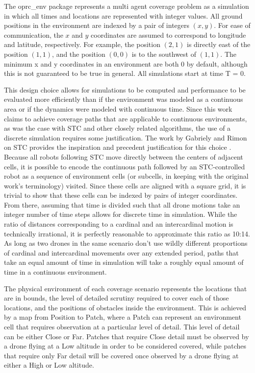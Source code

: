 The oprc\_env package represents a multi agent coverage problem as a simulation in which all times and locations are represented with integer values. All ground positions in the environment are indexed by a pair of integers $ (x, y) $. For ease of communication, the $x$ and $y$ coordinates are assumed to correspond to longitude and latitude, respectively. For example, the position $(2, 1)$ is directly east of the position $(1, 1)$, and the position $(0, 0)$ is to the southwest of $(1, 1)$. The minimum x and y coordinates in an environment are both 0 by default, although this is not guaranteed to be true in general. All simulations start at time T = 0.

This design choice allows for simulations to be computed and performance to be evaluated more efficiently than if the environment was modeled as a continuous area or if the dynamics were modeled with continuous time. Since this work claims to achieve coverage paths that are applicable to continuous environments, as was the case with STC and other closely related algorithms, the use of a discrete simulation requires some justification. The work by Gabriely and Rimon on STC provides the inspiration and precedent justification for this choice \cite{STC}. Because all robots following STC move directly between the centers of adjacent cells, it is possible to encode the continuous path followed by an STC-controlled robot as a sequence of environment cells (or subcells, in keeping with the original work's terminology) visited. Since these cells are aligned with a square grid, it is trivial to show that these cells can be indexed by pairs of integer coordinates. From there, assuming that time is divided such that all drone motions take an integer number of time steps allows for discrete time in simulation. While the ratio of distances corresponding to a cardinal and an intercardinal motion is technically irrational, it is perfectly reasonable to approximate this ratio as 10:14. As long as two drones in the same scenario don't use wildly different proportions of cardinal and intercardinal movements over any extended period, paths that take an equal amount of time in simulation will take a roughly equal amount of time in a continuous environment.

The physical environment of each coverage scenario represents the locations that are in bounds, the level of detailed scrutiny required to cover each of those locations, and the positions of obstacles inside the environment. This is achieved by a map from Position to Patch, where a Patch can represent an environment cell that requires observation at a particular level of detail. This level of detail can be either Close or Far. Patches that require Close detail must be observed by a drone flying at a Low altitude in order to be considered covered, while patches that require only Far detail will be covered once observed by a drone flying at either a High or Low altitude.

